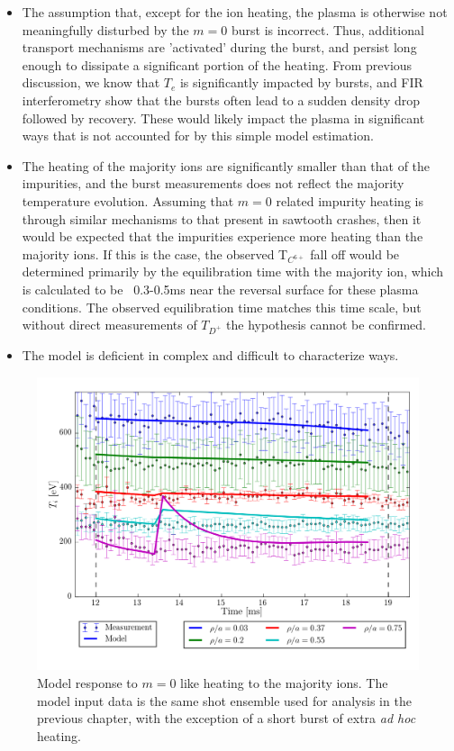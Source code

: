 \begin{refsection}
\begin{itemize}
    \item The assumption that, except for the ion heating, the plasma is otherwise not meaningfully disturbed by the $m = 0$ burst is incorrect. Thus, additional transport mechanisms are 'activated' during the burst, and persist long enough to dissipate a significant portion of the heating. From previous discussion, we know that $T_e$ is significantly impacted by bursts, and FIR interferometry show that the bursts often lead to a sudden density drop followed by recovery. These would likely impact the plasma in significant ways that is not accounted for by this simple model estimation.
    \item The heating of the majority ions are significantly smaller than that of the impurities, and the burst measurements does not reflect the majority temperature evolution. Assuming that $m = 0$ related impurity heating is through similar mechanisms to that present in sawtooth crashes, then it would be expected that the impurities experience more heating than the majority ions. If this is the case, the observed T$_{C^{6+}}$ fall off would be determined primarily by the equilibration time with the majority ion, which is calculated to be ~0.3-0.5ms near the reversal surface for these plasma conditions. The observed equilibration time matches this time scale, but without direct measurements of $T_{D^+}$ the hypothesis cannot be confirmed.
    \item The model is deficient in complex and difficult to characterize ways.
\end{itemize}

\begin{figure}
	\centering
	\includegraphics[width = 1.\linewidth]{./m0_and_impurity_heating/m0_model.png}
	\caption[Model response to $m = 0$ like heating to the majority ions.]{Model response to $m = 0$ like heating to the majority ions. The model input data is the same shot ensemble used for analysis in the previous chapter, with the exception of a short burst of extra \textit{ad hoc} heating. }\label{fig:m0_model}
\end{figure}


\end{refsection}
